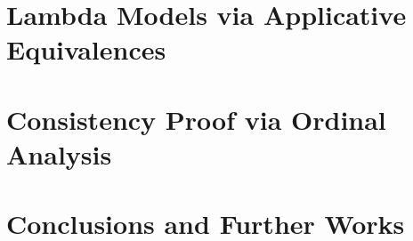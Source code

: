 \documentclass[hidelinks]{lmcs} %
\theoremstyle{plain}\newtheorem{satz}[thm]{Satz} %
\begin{document}
\section{Lambda Models via Applicative Equivalences}\label{sec:lammod}

\section{Consistency Proof via Ordinal Analysis}\label{sec:consistency}

\section{Conclusions and Further Works}\label{sec:conclusions}





%
\end{document}
